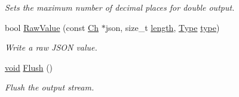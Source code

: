 \begin{DoxyCompactItemize}
\begin{DoxyCompactList}\small\item\em Sets the maximum number of decimal places for double output. \end{DoxyCompactList}\item 
bool \hyperlink{classWriter_ae0d1615104e4e88040b9640e6784008a}{Raw\+Value} (const \hyperlink{classWriter_ab08bff5fd2daec65f4a78779ca3d2139}{Ch} $\ast$json, size\+\_\+t \hyperlink{imgui__impl__opengl3__loader_8h_a011fc24f10426c01349e94a4edd4b0d5}{length}, \hyperlink{rapidjson_8h_a1d1cfd8ffb84e947f82999c682b666a7}{Type} \hyperlink{imgui__impl__opengl3__loader_8h_a63267399cd2a2ee217572c11d2e54f07}{type})
\begin{DoxyCompactList}\small\item\em Write a raw J\+S\+ON value. \end{DoxyCompactList}\item 
\hyperlink{imgui__impl__opengl3__loader_8h_ac668e7cffd9e2e9cfee428b9b2f34fa7}{void} \hyperlink{classWriter_a8ca4e364c546b2eb526caa68dde011d2}{Flush} ()
\begin{DoxyCompactList}\small\item\em Flush the output stream. \end{DoxyCompactList}\end{DoxyCompactItemize}

